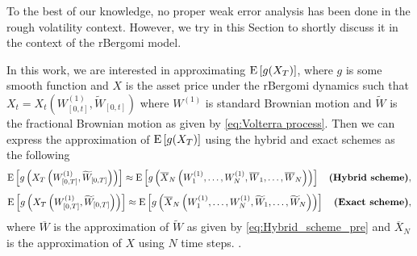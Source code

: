 To the best of our knowledge, no proper weak error
analysis has been done in the rough volatility context. However, we try in this Section  to shortly discuss it in the context of the rBergomi model.

In this work, we are interested in approximating $\mathrm{E}\left[g(X_T)\right]$, where $g$ is some smooth function and $X$ is the asset price under the rBergomi dynamics such that $X_t=X_t(W^{(1)}_{[0,t]},\widetilde{W}_{[0,t]})$ where $W^{(1)}$ is standard Brownian motion and  $\widetilde{W}$ is the fractional Brownian motion as given by \eqref{eq:Volterra process}.  Then we can express the approximation of $\mathrm{E}\left[g(X_T)\right]$  using the  hybrid and exact schemes as the following 
\begin{align*}
\mathrm{E}\left[g\left(X_T\left(W^{(1)}_{[0,T]},\widetilde{W}_{[0,T]}\right)\right)\right] \approx \mathrm{E}\left[g\left(\overline{X}_N\left(W^{(1)}_1,\dots,W^{(1)}_N, \overline{W}_1, \dots,\overline{W}_N\right)\right)\right] \quad \textbf{(Hybrid  scheme)},
\end{align*}
\begin{align*}
\mathrm{E}\left[g\left(X_T\left(W^{(1)}_{[0,T]},\widetilde{W}_{[0,T]}\right)\right)\right] \approx \mathrm{E}\left[g\left(\overline{X}_N\left(W^{(1)}_1,\dots,W^{(1)}_N, \widetilde{W}_1, \dots,\widetilde{W}_N\right)\right)\right] \quad \textbf{(Exact  scheme)},
\end{align*}
where $\overline{W}$ is the approximation of $\widetilde{W}$  as given by \eqref{eq:Hybrid_scheme_pre} and $\overline{X}_N$ is the approximation of $X$ using $N$ time steps. . 
